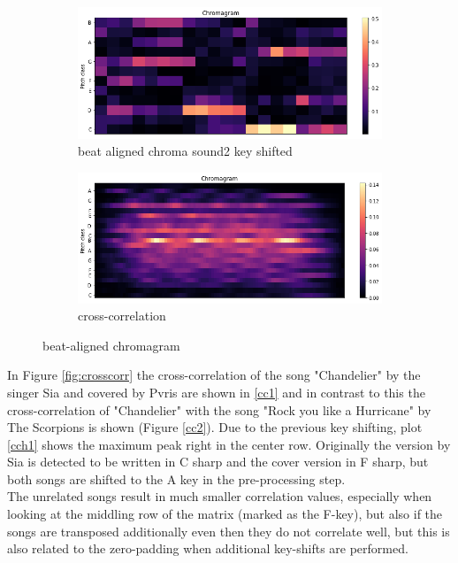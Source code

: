 \begin{figure}[htbp]
{{			\begin{subfigure}{.495\textwidth}
				\centering     
				\includegraphics[scale=0.3]{Images/Chroma/beatalignedchroma2_ks.png}
				\caption{beat aligned chroma sound2 key shifted}
				\label{cks2}
			\end{subfigure}%
			\begin{subfigure}{.495\textwidth}
				\centering     
				\includegraphics[scale=0.3]{Images/Chroma/beatalignedchroma_corr.png}
				\caption{cross-correlation}
				\label{c2}
			\end{subfigure}%
	}}
	\caption{beat-aligned chromagram}
	\label{fig:beatalign}
\end{figure}
In Figure \ref{fig:crosscorr} the cross-correlation of the song "Chandelier" by the singer Sia and covered by Pvris are shown in \ref{cc1} and in contrast to this the cross-correlation of "Chandelier" with the song "Rock you like a Hurricane" by The Scorpions is shown (Figure \ref{cc2}). Due to the previous key shifting, plot \ref{cch1} shows the maximum peak right in the center row. Originally the version by Sia is detected to be written in C sharp and the cover version in F sharp, but both songs are shifted to the A key in the pre-processing step.\\
The unrelated songs result in much smaller correlation values, especially when looking at the middling row of the matrix (marked as the F-key), but also if the songs are transposed additionally even then they do not correlate well, but this is also related to the zero-padding when additional key-shifts are performed. 
